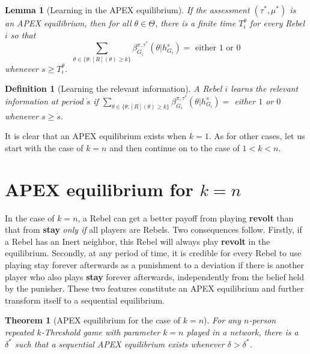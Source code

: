\documentclass[12pt,letter]{article}
\newtheorem{theorem}{Theorem}
\newtheorem{lemma}{Lemma}[section]
\newtheorem{definition}{Definition}[section]
\theoremstyle{definition}
\theoremstyle{remark}
\theoremstyle{claim}
\begin{document}
\begin{lemma}[Learning in the APEX equilibrium]\label{lemma_learn}
If the assessment $(\tau^*,\mu^{*})$ is an APEX equilibrium, then for all $\theta\in \Theta$, there is a finite time $T^{\theta}_i$ for every Rebel $i$ so that
\[\sum_{\theta\in\{\theta:[R](\theta)\geq k\}}\beta^{\pi,\tau^*}_{G_i}(\theta|h^{s}_{G_i})= \text{ either } 1 \text{ or } 0\]
whenever $s\geq T^{\theta}_i$.
\end{lemma}



\begin{definition}[Learning the relevant information]\label{def_learn}
A Rebel $i$ learns the relevant information at period $\dot{s}$ if $\sum_{\theta\in\{\theta:[R](\theta)\geq k\}}\beta^{\pi,\tau^*}_{G_i}(\theta|h^{s}_{G_i})=$ either $1$ or $0$ whenever $s\geq \dot{s}$.
\end{definition}

It is clear that an APEX equilibrium exists when $k=1$. As for other cases, let us start with the case of $k=n$ and then continue on to the case of $1<k<n$.

\section{APEX equilibrium for $k=n$}
\label{sec:equilibrium_1}


In the case of $k=n$, a Rebel can get a better payoff from playing \textbf{revolt} than that from \textbf{stay} \textit{only if} all players are Rebels. Two consequences follow. Firstly, if a Rebel has an Inert neighbor, this Rebel will always play \textbf{revolt} in the equilibrium. Secondly, at any period of time, it is credible for every Rebel to use playing stay forever afterwards as a punishment to a deviation if there is another player who also plays \textbf{stay} forever afterwards, independently from the belief held by the punisher. These two features constitute an APEX equilibrium and further transform itself to a sequential equilibrium. 

\begin{theorem}[APEX equilibrium for the case of $k=n$]
\label{thm_minor_thm}
For any $n$-person repeated $k$-Threshold game with parameter $k=n$ played in a network, there is a $\delta^{*}$ such that a sequential APEX equilibrium exists whenever $\delta >
\delta^{*}$.
\end{theorem}
\end{document}
